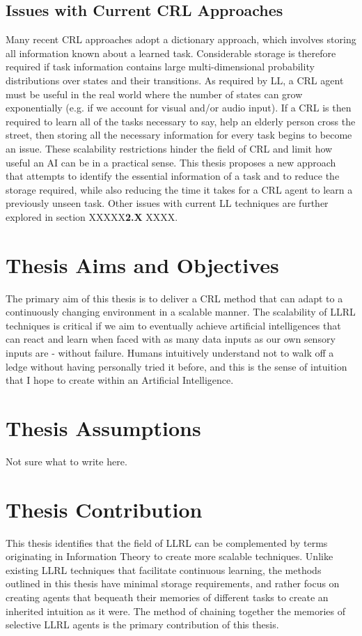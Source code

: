 \subsection{Issues with Current CRL Approaches}
Many recent CRL approaches adopt a dictionary approach, which involves storing all information known about a learned task. Considerable storage is therefore required if task information contains large multi-dimensional probability distributions over states and their transitions. As required by LL, a CRL agent must be useful in the real world where the number of states can grow exponentially (e.g. if we account for visual and/or audio input). If a CRL is then required to learn all of the tasks necessary to say, help an elderly person cross the street, then storing all the necessary information for every task begins to become an issue. These scalability restrictions hinder the field of CRL and limit how useful an AI can be in a practical sense. This thesis proposes a new approach that attempts to identify the essential information of a task and to reduce the storage required, while also reducing the time it takes for a CRL agent to learn a previously unseen task. Other issues with current LL techniques are further explored in section XXXXX\textbf{2.X }XXXX. 

\section{Thesis Aims and Objectives}
The primary aim of this thesis is to deliver a CRL method that can adapt to a continuously changing environment in a scalable manner. The scalability of LLRL techniques is critical if we aim to eventually achieve artificial intelligences that can react and learn when faced with as many data inputs as our own sensory inputs are - without failure. Humans intuitively understand not to walk off a ledge without having personally tried it before, and this is the sense of intuition that I hope to create within an Artificial Intelligence. 

\section{Thesis Assumptions}
Not sure what to write here.

\section{Thesis Contribution}
This thesis identifies that the field of LLRL can be complemented by terms originating in Information Theory to create more scalable techniques. Unlike existing LLRL techniques that facilitate continuous learning, the methods outlined in this thesis have minimal storage requirements, and rather focus on  creating agents that bequeath their memories of different tasks to create an inherited intuition as it were.  The method of chaining together the memories of selective LLRL agents is the primary contribution of this thesis. 

